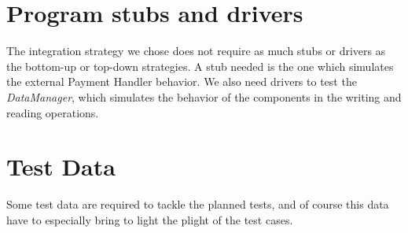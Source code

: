 \documentclass{scrreprt}
\begin{document}
\section{Program stubs and drivers}
The integration strategy we chose does not require as much stubs or drivers as the bottom-up or top-down strategies.
A stub needed is the one which simulates the external Payment Handler behavior.
We also need drivers to test the \emph{DataManager}, which simulates the behavior of the components in the writing and reading operations.

\section{Test Data}
Some test data are required to tackle the planned tests, and of course this data have to especially bring to light the plight of the test cases.
\end{document}
